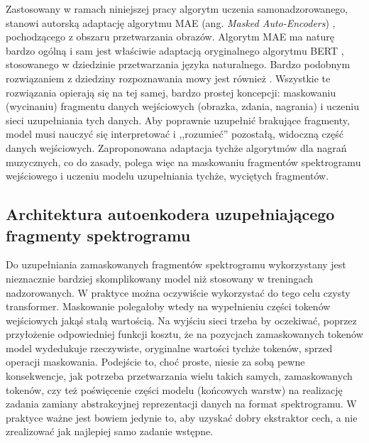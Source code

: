 Zastosowany w ramach niniejszej pracy algorytm uczenia samonadzorowanego, stanowi autorską adaptację
algorytmu MAE (ang. \emph{Masked Auto-Encoders}) \cite{he_masked_2021}, pochodzącego z obszaru
przetwarzania obrazów. Algorytm MAE ma naturę bardzo ogólną i sam jest właściwie adaptacją
oryginalnego algorytmu BERT \cite{devlin_bert_2019}, stosowanego w dziedzinie przetwarzania języka
naturalnego. Bardzo podobnym rozwiązaniem z dziedziny rozpoznawania mowy jest również
\cite{baevski_wav2vec_2020}. Wszystkie te rozwiązania opierają się na tej samej, bardzo prostej
koncepcji: maskowaniu (wycinaniu) fragmentu danych wejściowych (obrazka, zdania, nagrania) i uczeniu
sieci uzupełniania tych danych. Aby poprawnie uzupełnić brakujące fragmenty, model musi nauczyć się
interpretować i ,,rozumieć'' pozostałą, widoczną część danych wejściowych. Zaproponowana adaptacja
tychże algorytmów dla nagrań muzycznych, co do zasady, polega więc na maskowaniu fragmentów
spektrogramu wejściowego i uczeniu modelu uzupełniania tychże, wyciętych fragmentów.

\subsection{Architektura autoenkodera uzupełniającego fragmenty spektrogramu}

Do uzupełniania zamaskowanych fragmentów spektrogramu wykorzystany jest nieznacznie bardziej
skomplikowany model niż stosowany w treningach nadzorowanych. W praktyce można oczywiście
wykorzystać do tego celu czysty transformer. Maskowanie polegałoby wtedy na wypełnieniu części
tokenów wejściowych jakąś stałą wartością. Na wyjściu sieci trzeba by oczekiwać, poprzez przyłożenie
odpowiedniej funkcji kosztu, że na pozycjach zamaskowanych tokenów model wydedukuje rzeczywiste,
oryginalne wartości tychże tokenów, sprzed operacji maskowania. Podejście to, choć proste, niesie
za sobą pewne konsekwencje, jak potrzeba przetwarzania wielu takich samych, zamaskowanych tokenów,
czy też poświęcenie części modelu (końcowych warstw) na realizację zadania zamiany abstrakcyjnej
reprezentacji danych na format spektrogramu. W praktyce ważne jest bowiem jedynie to, aby uzyskać
dobry ekstraktor cech, a nie zrealizować jak najlepiej samo zadanie wstępne.


